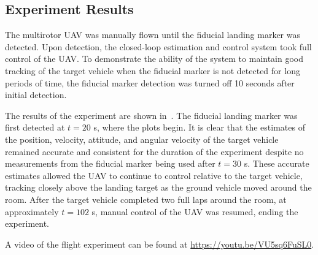 
\subsection{Experiment Results}
The multirotor UAV was manually flown until the
fiducial landing marker was detected. Upon detection, the closed-loop estimation
and control system took full control of the UAV. To demonstrate the ability of the
system to maintain good tracking of the target vehicle when the fiducial
marker is not detected for long periods of time, the fiducial marker detection
was turned off 10 seconds after initial detection.

The results of the experiment are shown in~.
The fiducial landing marker was first detected at $t = 20$ s, where the plots
begin.
It is clear that the estimates of the position, velocity, attitude, and angular
velocity of the target vehicle remained accurate and consistent for the duration
of the experiment despite no measurements from the fiducial marker being used
after $t = 30$ s.
These accurate estimates allowed
the UAV to continue to control relative to the target vehicle, tracking closely
above the landing target as the ground vehicle moved around the room. After the
target vehicle completed two full laps around the room,
at approximately $t=102$ s, manual control of the UAV was resumed, ending the experiment.

A video of the flight experiment can be found at
\url{https://youtu.be/VU5sq6FuSL0}.

